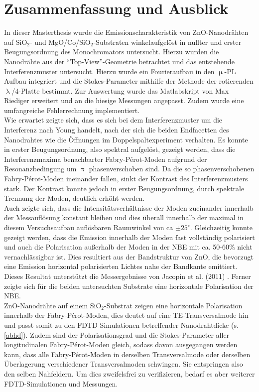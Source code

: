 \chapter{Zusammenfassung und Ausblick}
In dieser Masterthesis wurde die Emissionscharakteristik von ZnO-Nanodrähten auf SiO$_\text{2}$- und MgO/Co/SiO$_\text{2}$-Substraten winkelaufgelöst in nullter und erster Beugungsordnung des Monochromators untersucht. Hierzu wurden die Nanodrähte aus der ``Top-View''-Geometrie betrachtet und das entstehende Interferenzmuster untersucht. Hierzu wurde ein Fourieraufbau in den $\upmu$-PL Aufbau integriert und die Stokes-Parameter mithilfe der Methode der rotierenden $\uplambda$/4-Platte bestimmt. Zur Auswertung wurde das Matlabskript von Max Riediger \cite{Riediger.Master} erweitert und an die hiesige Messungen angepasst. Zudem wurde eine umfangreiche Fehlerrechnung implementiert.\\ 
Wie erwartet zeigte sich, dass es sich bei dem Interferenzmuster um die Interferenz nach Young handelt, nach der sich die beiden Endfacetten des Nanodrahtes wie die Öffnungen im Doppelspaltexperiment verhalten. Es konnte in erster Beugungsordnung, also spektral aufgelöst, gezeigt werden, dass die Interferenzmaxima benachbarter Fabry-Pérot-Moden aufgrund der Resonanzbedingung um $\uppi$ phasenverschoben sind. Da die so phasenverschobenen Fabry-Pérot-Moden ineinander fallen, sinkt der Kontrast des Interferenzmusters stark. Der Kontrast konnte jedoch in erster Beugungsordnung, durch spektrale Trennung der Moden, deutlich erhöht werden.\\
Auch zeigte sich, dass die Intensitätsverhältnisse der Moden zueinander innerhalb der Messauflösung konstant bleiben und dies überall innerhalb der maximal in diesem Versuchsaufbau auflösbaren Raumwinkel von ca $\pm \text{25}^\circ$. Gleichzeitig konnte gezeigt werden, dass die Emission innerhalb der Moden fast vollständig polarisiert und auch die Polarisation außerhalb der Moden in der NBE mit ca. 50-60\% nicht vernachlässigbar ist. Dies resultiert aus der Bandstruktur von ZnO, die bevorzugt eine Emission horizontal polarisierten Lichtes nahe der Bandkante emittiert. Dieses Resultat unterstützt die Messergebnisse von Jacopin et al. (2011) \cite{Jacopin.2011}. Ferner zeigte sich für die beiden untersuchten Substrate eine horizontale Polarisation der NBE.\\
ZnO-Nanodrähte auf einem SiO$_\text{2}$-Substrat zeigen eine horizontale Polarisation innerhalb der Fabry-Pérot-Moden, dies deutet auf eine TE-Transversalmode hin und passt somit zu den FDTD-Simulationen betreffender Nanodrahtdicke (s. \autoref{abhd}). Zudem sind der Polarisationsgrad und die Stokes-Parameter aller longitudinalen Fabry-Pérot-Moden gleich, sodass davon ausgegangen werden kann, dass alle Fabry-Pérot-Moden in derselben Transversalmode oder derselben Überlagerung verschiedener Transversalmoden schwingen. Sie entspringen also den selben Nahfeldern. Um dies zweifelsfrei zu verifizieren, bedarf es aber weiterer FDTD-Simulationen und Messungen.\\
